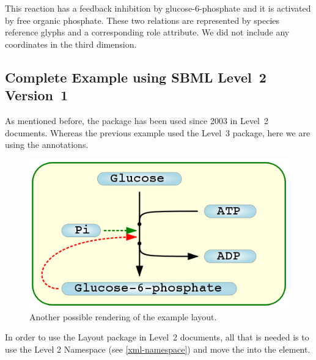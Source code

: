 This reaction has a feedback inhibition by glucose-6-phosphate and it is 
activated by free organic phosphate. These two relations are represented 
by species reference glyphs and a corresponding role attribute. We did 
not include any coordinates in the third dimension. 

\pagebreak
\subsection{Complete Example using SBML Level~2 Version~1}
\label{l2example}
As mentioned before, the \Layout package has been used since 2003 in 
\SBML Level~2 documents. Whereas the previous example used the Level~3 
package, here we are using the \SBML annotations. 


\begin{center}
\begin{figure}[!ht]
\includegraphics[scale=0.5]{figures/TestModel3-g++}
\caption{Another possible rendering of the example layout.}
\end{figure}
\end{center}

In order to use the Layout package in \SBML Level~2 documents, all that 
is needed is to use the Level 2 Namespace (see \ref{xml-namespace}) and 
move the \ListOfLayouts into the \Model {} element. 



